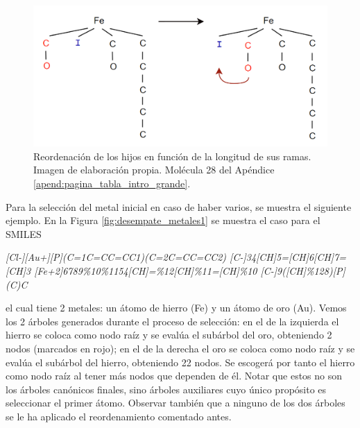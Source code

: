 \begin{figure}[h!]
    \centering
    \includegraphics[scale=0.4]{imagenes/diseno/canonizado/rearrange.png}
    \caption{Reordenación de los hijos en función de la longitud de sus ramas. Imagen de elaboración propia. Molécula 28 del Apéndice \ref{apend:pagina_tabla_intro_grande}.}
    \label{fig:rearrangeTree}
\end{figure}

Para la selección del metal inicial en caso de haber varios, se muestra el siguiente ejemplo. En la Figura \ref{fig:desempate_metales1} se muestra el caso para el SMILES 

\begin{center}
\textit{[Cl-][Au+][P](C=1C=CC=CC1)(C=2C=CC=CC2) [C-]34[CH]5=[CH]6[CH]7=[CH]3 [Fe+2]6789\%10\%1154[CH]=\%12[CH]\%11=[CH]\%10 [C-]9([CH]\%128)[P](C)C}
    
\end{center}

el cual tiene 2 metales: un átomo de hierro (Fe) y un átomo de oro (Au). Vemos los 2 árboles generados durante el proceso de selección: en el de la izquierda el hierro se coloca como nodo raíz y se evalúa el subárbol del oro, obteniendo 2 nodos (marcados en rojo); en el de la derecha el oro se coloca como nodo raíz y se evalúa el subárbol del hierro, obteniendo 22 nodos. Se escogerá por tanto el hierro como nodo raíz al tener más nodos que dependen de él. Notar que estos no son los árboles canónicos finales, sino árboles auxiliares cuyo único propósito es seleccionar el primer átomo. Observar también que a ninguno de los dos árboles se le ha aplicado el reordenamiento comentado antes.


